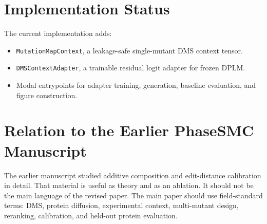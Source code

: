 \documentclass{article}
\newcommand{\1}{\mathbf{1}}
\begin{document}



\newpage
\appendix
\onecolumn

\section{Implementation Status}

The current implementation adds:
\begin{itemize}
  \item \texttt{MutationMapContext}, a leakage-safe single-mutant DMS context tensor.
  \item \texttt{DMSContextAdapter}, a trainable residual logit adapter for frozen DPLM.
  \item Modal entrypoints for adapter training, generation, baseline evaluation, and figure construction.
\end{itemize}

\section{Relation to the Earlier PhaseSMC Manuscript}

The earlier manuscript studied additive composition and edit-distance calibration in detail. That material is useful as theory and as an ablation. It should not be the main language of the revised paper. The main paper should use field-standard terms: DMS, protein diffusion, experimental context, multi-mutant design, reranking, calibration, and held-out protein evaluation.
\end{document}
